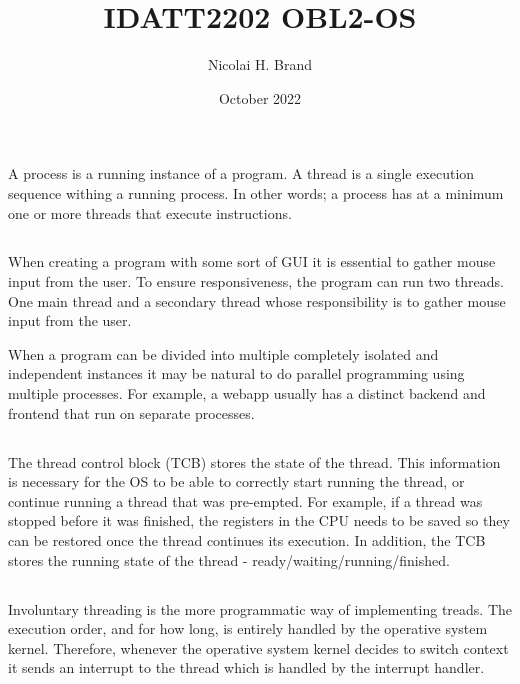 \documentclass{article}
\title{IDATT2202 OBL2-OS}
\author{Nicolai H. Brand}
\date{October 2022}
\begin{document}
\maketitle

\section{}
\subsection{}
A process is a running instance of a program. A thread is a single execution sequence withing a running process. In other words; a process has at a minimum one or more threads that execute instructions.

\subsection{}
When creating a program with some sort of GUI it is essential to gather mouse input from the user. To ensure responsiveness, the program can run two threads. One main thread and a secondary thread whose responsibility is to gather mouse input from the user.

When a program can be divided into multiple completely isolated and independent instances it may be natural to do parallel programming using multiple processes. For example, a webapp usually has a distinct backend and frontend that run on separate processes.

\subsection{}
The thread control block (TCB) stores the state of the thread. This information is necessary for the OS to be able to correctly start running the thread, or continue running a thread that was pre-empted. For example, if a thread was stopped before it was finished, the registers in the CPU needs to be saved so they can be restored once the thread continues its execution. In addition, the TCB stores the running state of the thread - ready/waiting/running/finished.

\subsection{}
Involuntary threading is the more programmatic way of implementing treads. The execution order, and for how long, is entirely handled by the operative system kernel. Therefore, whenever the operative system kernel decides to switch context it sends an interrupt to the thread which is handled by the interrupt handler.
\end{document}
